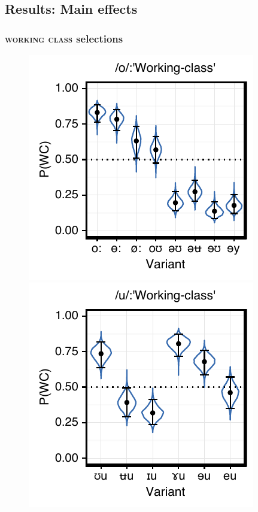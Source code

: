 \documentclass[PWPL]{article}
\begin{document}
\subsection{Results: Main effects}
\subsubsection{\textsc{working class} selections}
\begin{figure}[ht]
\centering
\includegraphics[scale=0.75]{ow_class.pdf}
\includegraphics[scale=0.75]{uw_class.pdf}
\end{figure}
\end{document}
